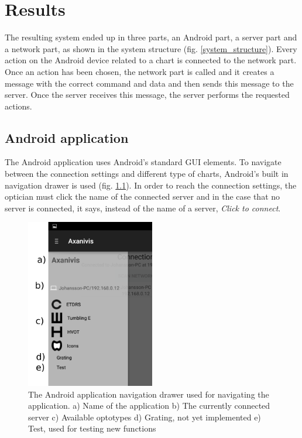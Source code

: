 \documentclass[12pt,a4paper,notitlepage]{report}
\begin{document}
\chapter{ Results}
The resulting system ended up in three parts, an Android part, a server part and a network part, as shown in the system structure (fig. \ref{system_structure}). Every action on the Android device related to a chart is connected to the network part. Once an action has been chosen, the network part is called and it creates a message with the correct command and data and then sends this message to the server. Once the server receives this message, the server performs the requested actions.

\section{Android application}
The Android application uses Android's standard GUI elements. To navigate between the connection settings and different type of charts, Android's built in navigation drawer is used (fig. \ref{fig:app_nav_drawer}). In order to reach the connection settings, the optician must click the name of the connected server and in the case that no server is connected, it says, instead of the name of a server, \textit{Click to connect}.

\begin{figure}[ht!]
\centering
\includegraphics[width=56mm]{images/appgui/nav_drawer.png}
\caption[Android Navigation Drawer]{The Android application navigation drawer used for navigating the application. a) Name of the application b) The currently connected server c) Available optotypes d) Grating, not yet implemented e) Test, used for testing new functions}
\label{fig:app_nav_drawer}
\end{figure}
\end{document}
